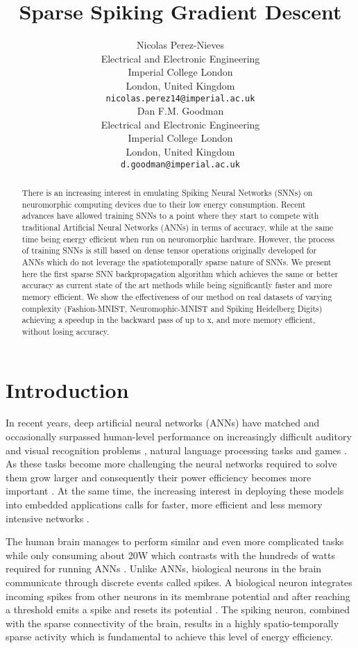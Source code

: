 \documentclass{article}
\title{Sparse Spiking Gradient Descent }
\author{Nicolas Perez-Nieves \\
  Electrical and Electronic Engineering\\
  Imperial College London\\
  London, United Kingdom \\
  \texttt{nicolas.perez14@imperial.ac.uk} \\
\And
  Dan F.M. Goodman \\
  Electrical and Electronic Engineering\\
  Imperial College London\\
  London, United Kingdom \\
  \texttt{d.goodman@imperial.ac.uk} \\
}
\begin{document}
\maketitle

\begin{abstract}
  There is an increasing interest in emulating Spiking Neural Networks (SNNs) on neuromorphic computing devices due to their low energy consumption. Recent advances have allowed training SNNs to a point where they start to compete with traditional Artificial Neural Networks (ANNs) in terms of accuracy, while at the same time being energy efficient when run on neuromorphic hardware. However, the process of training SNNs is still based on dense tensor operations originally developed for ANNs which do not leverage the spatiotemporally sparse nature of SNNs. We present here the first sparse SNN backpropagation algorithm which achieves the same or better accuracy as current state of the art methods while being significantly faster and more memory efficient. We show the effectiveness of our method on real datasets of varying complexity (Fashion-MNIST, Neuromophic-MNIST and Spiking Heidelberg Digits) achieving a speedup in the backward pass of up to x, and  more memory efficient, without losing accuracy. 
\end{abstract}

\section{Introduction}

In recent years, deep artificial neural networks (ANNs) have matched and occasionally surpassed human-level performance on increasingly difficult auditory and visual recognition problems \cite{lecun2015deep, hinton2012deep, krizhevsky2012imagenet}, natural language processing tasks \cite{zhang2019ernie, brown2020language} and games \cite{mnih2015human, silver2017mastering, vinyals2019grandmaster}.  As these tasks become more challenging the neural networks required to solve them grow larger and consequently their power efficiency becomes more important \cite{strubell2019energy, schwartz2019green}. At the same time, the increasing interest in deploying these models into embedded applications calls for faster, more efficient and less memory intensive networks \cite{hochstetler2018embedded, lane2017squeezing}.

The human brain manages to perform similar and even more complicated tasks while only consuming about 20W \cite{mink1981ratio} which contrasts with the hundreds of watts required for running ANNs \cite{strubell2019energy}. Unlike ANNs, biological neurons in the brain communicate through discrete events called spikes. A biological neuron integrates incoming spikes from other neurons in its membrane potential and after reaching a threshold emits a spike and resets its potential \cite{gerstner2014neuronal}. The spiking neuron, combined with the sparse connectivity of the brain, results in a highly spatio-temporally sparse activity \cite{cox2014neural} which is fundamental to achieve this level of energy efficiency. 
\end{document}

